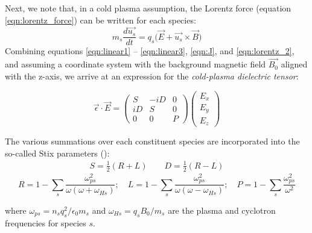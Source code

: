 Next, we note that, in a cold plasma assumption, the Lorentz force (equation \ref{eqn:lorentz_force}) can be written for each species:
\begin{equation}
m_s\frac{d\vec{u_s}}{dt} = q_s\big(\vec{E} + \vec{u_s}\times\vec{B}\big) 
\label{eqn:lorentz_2}
\end{equation}
Combining equations \ref{eqn:linear1} -- \ref{eqn:linear3}, \ref{eqn:J}, and \ref{eqn:lorentz_2}, and assuming a coordinate system with the background magnetic field $\vec{B_0}$ aligned with the z-axis, we arrive at an expression for the \emph{cold-plasma dielectric tensor}:

\begin{equation}
\vec{\epsilon}\cdot\vec{E}=\begin{pmatrix}
S & -iD & 0 \\
iD & S & 0 \\
0 & 0 & P \end{pmatrix}\begin{pmatrix}E_x \\ E_y \\ E_z\end{pmatrix}
\end{equation}

The various summations over each constituent species are incorporated into the so-called Stix parameters (\cite{Stix1992}):
\begin{eqnarray}
S =\frac{1}{2}(R + L) \qquad D = \frac{1}{2}(R - L)
\end{eqnarray}
\begin{equation}
R = 1 - \sum_s\frac{\omega_{ps}^2}{\omega(\omega + \omega_{Hs})}; \quad L = 1 - \sum_s\frac{\omega_{ps}^2}{\omega(\omega - \omega_{Hs})}; \quad P = 1 - \sum_s\frac{\omega_{ps}^2}{\omega^2}
\end{equation}

where $\omega_{ps} = n_sq_s^2/{\epsilon_0 m_s}$ and $\omega_{Hs}=q_sB_0/m_s$ are the plasma and cyclotron frequencies for species $s$.

